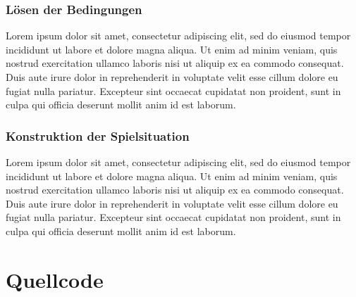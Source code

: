 \documentclass[a4paper,10pt,ngerman]{scrartcl}
\begin{document}
\subsubsection{Lösen der Bedingungen}
Lorem ipsum dolor sit amet, consectetur adipiscing elit, sed do eiusmod tempor incididunt ut labore et dolore magna aliqua.
Ut enim ad minim veniam, quis nostrud exercitation ullamco laboris nisi ut aliquip ex ea commodo consequat.
Duis aute irure dolor in reprehenderit in voluptate velit esse cillum dolore eu fugiat nulla pariatur.
Excepteur sint occaecat cupidatat non proident, sunt in culpa qui officia deserunt mollit anim id est laborum.

\subsubsection{Konstruktion der Spielsituation}
Lorem ipsum dolor sit amet, consectetur adipiscing elit, sed do eiusmod tempor incididunt ut labore et dolore magna aliqua.
Ut enim ad minim veniam, quis nostrud exercitation ullamco laboris nisi ut aliquip ex ea commodo consequat.
Duis aute irure dolor in reprehenderit in voluptate velit esse cillum dolore eu fugiat nulla pariatur.
Excepteur sint occaecat cupidatat non proident, sunt in culpa qui officia deserunt mollit anim id est laborum.

\section{Quellcode}
\end{document}
